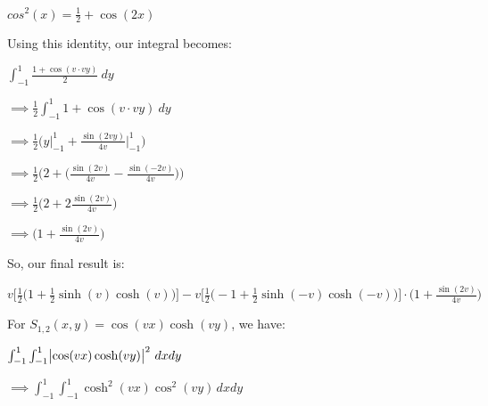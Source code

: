 \documentclass[executivepaper]{article}
\begin{document}
\begin{flushleft}
\begin{center}

$cos^2(x)=\frac{1}{2}+\cos(2x)$

\end{center}

Using this identity, our integral becomes:

\begin{center}

$\int_{-1}^{1} \frac{1+\cos(v \cdot vy)}{2} \ dy$

\vspace{1mm}

$\implies \frac{1}{2} \int_{-1}^{1} 1+\cos(v \cdot vy) \ dy$

\vspace{1mm}

$\implies \frac{1}{2} \bigg(y \Big|_{-1}^{1} + \frac{\sin(2vy)}{4v} \Big|_{-1}^{1} \bigg)$

\vspace{1mm}

$\implies \frac{1}{2} \bigg(2 + \bigg(\frac{\sin(2v)}{4v} - \frac{\sin(-2v)}{4v}\bigg) \bigg)$

\vspace{1mm}

$\implies \frac{1}{2} \bigg(2 + 2\frac{\sin(2v)}{4v} \bigg)$

\vspace{1mm}

$\implies \bigg(1 + \frac{\sin(2v)}{4v} \bigg)$

\end{center}

So, our final result is:

\begin{center}

$v \bigg[\frac{1}{2} \bigg(1+\frac{1}{2}\sinh(v)\cosh(v)\bigg) \bigg]-v \bigg[\frac{1}{2} \bigg(-1+\frac{1}{2}\sinh(-v)\cosh(-v)\bigg) \bigg] \cdot \bigg(1 + \frac{\sin(2v)}{4v} \bigg)$

\end{center}

For $S_{1,2}(x,y)=\cos(vx)\cosh(vy)$, we have:

\begin{center}

$\int_{-1}^{1} \int_{-1}^{1} \abs{\cos(vx)\cosh(vy)}^2 \,dx dy$

\vspace{1mm}

$\implies \int_{-1}^{1} \int_{-1}^{1} \cosh^2(vx)\cos^2(vy) \,dx dy$


\end{center}
\end{flushleft}
\end{document}
